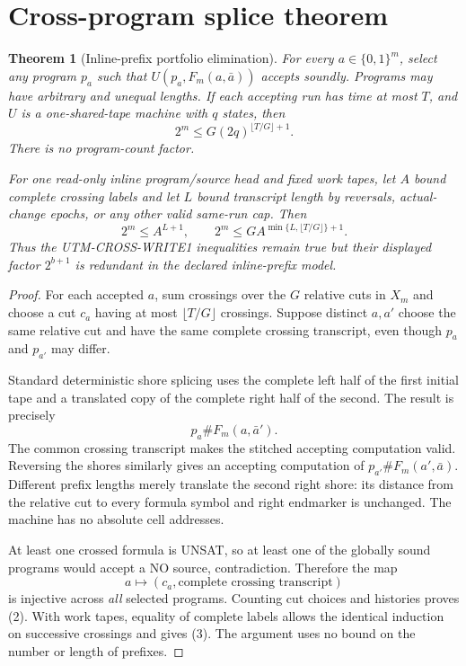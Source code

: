 \documentclass[11pt]{article}
\newtheorem{theorem}{Theorem}
\begin{document}
\section{Cross-program splice theorem}
\begin{theorem}[Inline-prefix portfolio elimination]\label{th:inline}
For every $a\in\{0,1\}^m$, select any program $p_a$ such that
$U(p_a,F_m(a,\bar a))$ accepts soundly.  Programs may have arbitrary and unequal lengths.  If each accepting run has time at most $T$, and $U$ is a one-shared-tape machine with $q$ states, then
\[
 \boxed{2^m\le G(2q)^{\lfloor T/G\rfloor+1}.}       \tag{2}
\]
There is no program-count factor.

For one read-only inline program/source head and fixed work tapes, let $A$ bound complete crossing labels and let
$L$ bound transcript length by reversals, actual-change epochs, or any other valid same-run cap.  Then
\[
 \boxed{2^m\le A^{L+1}},\qquad
 \boxed{2^m\le G A^{\min\{L,\lfloor T/G\rfloor\}+1}.} \tag{3}
\]
Thus the UTM-CROSS-WRITE1 inequalities remain true but their displayed factor $2^{b+1}$ is redundant in the declared inline-prefix model.
\end{theorem}
\begin{proof}
For each accepted $a$, sum crossings over the $G$ relative cuts in $X_m$ and choose a cut $c_a$ having at most $\lfloor T/G\rfloor$ crossings.  Suppose distinct $a,a'$ choose the same relative cut and have the same complete crossing transcript, even though $p_a$ and $p_{a'}$ may differ.

Standard deterministic shore splicing uses the complete left half of the first initial tape and a translated copy of the complete right half of the second.  The result is precisely
\[
  p_a\#F_m(a,\bar a').
\]
The common crossing transcript makes the stitched accepting computation valid.  Reversing the shores similarly gives an accepting computation of
$p_{a'}\#F_m(a',\bar a)$.  Different prefix lengths merely translate the second right shore: its distance from the relative cut to every formula symbol and right endmarker is unchanged.  The machine has no absolute cell addresses.

At least one crossed formula is UNSAT, so at least one of the globally sound programs would accept a NO source, contradiction.  Therefore the map
\[
          a\longmapsto(c_a,\text{complete crossing transcript})
\]
is injective across \emph{all} selected programs.  Counting cut choices and histories proves (2).  With work tapes, equality of complete labels allows the identical induction on successive crossings and gives (3).  The argument uses no bound on the number or length of prefixes.
\end{proof}
\end{document}
